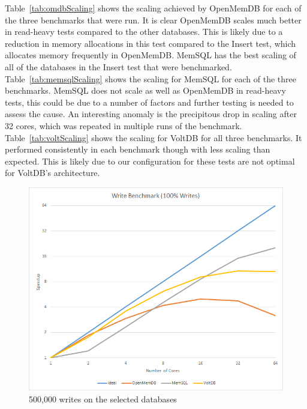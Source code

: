 \documentclass[conference, compsoc]{IEEEtran}
\begin{document}
Table~\ref{tab:omdbScaling} shows the scaling achieved by OpenMemDB for each of the three
benchmarks that were run. It is clear OpenMemDB scales much better in read-heavy tests compared to 
the other databases. This is likely due to a reduction in memory allocations in this test
compared to the Insert test, which allocates memory frequently in OpenMemDB.
MemSQL has the best scaling of all of the databases in the Insert test that were benchmarked.
Table~\ref{tab:memsqlScaling} shows the scaling for MemSQL for each of the three benchmarks. 
MemSQL does not scale as well as OpenMemDB in read-heavy tests, this could be due to a number of factors
and further testing is needed to assess the cause. An interesting anomaly is the precipitous drop in
scaling after 32 cores, which was repeated in multiple runs of the benchmark.
Table~\ref{tab:voltScaling} shows the scaling for VoltDB for all three benchmarks. It performed 
consistently in each benchmark though with less scaling than expected. This is likely due to
our configuration for these tests are not optimal for VoltDB's architecture.

\begin{figure}[H]
 \begin{center}
   \includegraphics[scale=.5]{WriteBenchmark.png}
  \caption{500,000 writes on the selected databases}
  \label{fig:writeBenchmark}
   \end{center}
\end{figure}
\end{document}
